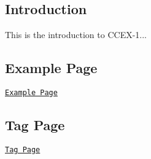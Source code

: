 \subsection*{Introduction}

This is the introduction to C\-C\-E\-X-\/1...

\subsection*{Example Page}

\href{example_page.html}{\tt Example Page}

\subsection*{Tag Page}

\href{tag_page.html}{\tt Tag Page} 